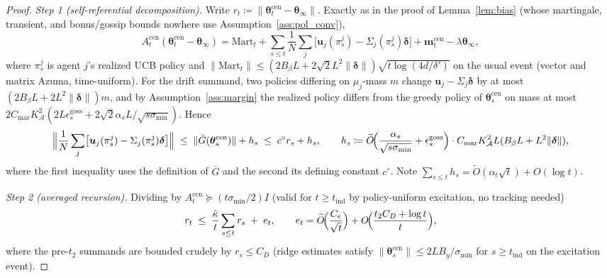 \documentclass[11pt]{article}
\newcommand{\Ot}{\widetilde{O}}
\begin{document}
\begin{proof}
\emph{Step 1 (self-referential decomposition).}  Write
$r_t\coloneqq\|\bm\theta_t^{\mathrm{cen}}-\bm\theta_\infty\|$.  Exactly
as in the proof of Lemma~\ref{lem:bias} (whose martingale, transient,
and bonus/gossip bounds nowhere use Assumption~\ref{ass:pol_conv}),
\[
A_t^{\mathrm{cen}}(\bm\theta_t^{\mathrm{cen}}-\bm\theta_\infty)
=\mathrm{Mart}_t
+\sum_{s\leq t}\frac1N\sum_j
\bigl[\bm u_j(\pi_s^j)-\Sigma_j(\pi_s^j)\bm\delta\bigr]
+\bm m_t^{\mathrm{cen}}-\lambda\bm\theta_\infty,
\]
where $\pi_s^j$ is agent $j$'s realized UCB policy and
$\|\mathrm{Mart}_t\|\leq(2B_\beta L+2\sqrt2L^2\|\bm\delta\|)
\sqrt{t\log(4d/\delta')}$ on the usual event (vector and matrix Azuma,
time-uniform).  For the drift summand, two policies differing on
$\mu_j$-mass $m$ change $\bm u_j-\Sigma_j\bm\delta$ by at most
$(2B_\beta L+2L^2\|\bm\delta\|)m$, and by Assumption~\ref{ass:margin}
the realized policy differs from the greedy policy of
$\bm\theta_s^{\mathrm{cen}}$ on mass at most
$2C_{\mathrm{mar}}K_{\mathcal A}^2
(2L\epsilon_s^{\mathrm{goss}}+2\sqrt2\alpha_sL/\sqrt{s\sigma_{\min}})$. Hence \[
\Bigl\|\frac1N\sum_j\bigl[\bm u_j(\pi_s^j)-\Sigma_j(\pi_s^j)\bm\delta\bigr]\Bigr\|
\;\leq\;\|\bar G(\bm\theta_s^{\mathrm{cen}})\|+h_s
\;\leq\;c^\circ r_s+h_s,
\qquad
h_s\coloneqq\Ot\!\Bigl(\frac{\alpha_s}{\sqrt{s\sigma_{\min}}}
+\epsilon_s^{\mathrm{goss}}\Bigr)\cdot
C_{\mathrm{mar}}K_{\mathcal A}^2L(B_\beta L+L^2\|\bm\delta\|),
\]
where the first inequality uses the definition of $\bar G$ and the
second its defining constant $c^\circ$.  Note $\sum_{s\leq t}h_s
=\Ot(\alpha_t\sqrt t)+O(\log t)$.

\emph{Step 2 (averaged recursion).}  Dividing by
$A_t^{\mathrm{cen}}\succeq(t\sigma_{\min}/2)I$ (valid for
$t\geq t_{\mathrm{ind}}$ by policy-uniform excitation, no tracking
needed) \[
r_t\;\leq\;\frac{\tilde\kappa}{t}\sum_{s\leq t}r_s\;+\;e_t,
\qquad
e_t=\Ot\!\Bigl(\frac{C_e}{\sqrt t}\Bigr)+O\!\Bigl(\frac{t_2C_D+\log t}{t}\Bigr),
\]
where the pre-$t_2$ summands are bounded crudely by
$r_s\leq C_D$ (ridge estimates satisfy
$\|\bm\theta_s^{\mathrm{cen}}\|\leq2LB_y/\sigma_{\min}$ for
$s\geq t_{\mathrm{ind}}$ on the excitation event).


\end{proof}
\end{document}
